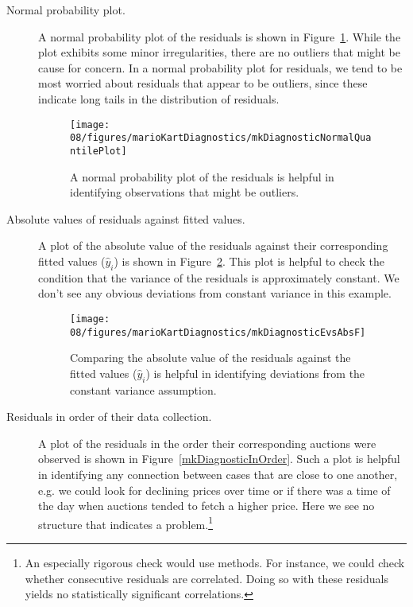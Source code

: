 \begin{description}
\item[Normal probability plot.] A normal probability plot of the residuals is shown in Figure~\ref{mkDiagnosticNormalQuantilePlot}. While the plot exhibits some minor irregularities, there are no outliers that might be cause for concern. In a normal probability plot for residuals, we tend to be most worried about residuals that appear to be outliers, since these indicate long tails in the distribution of residuals.

\begin{figure}
\centering
\texttt{[image: 08/figures/marioKartDiagnostics/mkDiagnosticNormalQuantilePlot]}
\caption{A normal probability plot of the residuals is helpful in identifying observations that might be outliers.}
\label{mkDiagnosticNormalQuantilePlot}
\end{figure}

\item[Absolute values of residuals against fitted values.] A plot of the absolute value of the residuals against their corresponding fitted values ($\hat{y}_i$) is shown in Figure~\ref{mkDiagnosticEvsAbsF}. This plot is helpful to check the condition that the variance of the residuals is approximately constant. We don't see any obvious deviations from constant variance in this example.

\begin{figure}
\centering
\texttt{[image: 08/figures/marioKartDiagnostics/mkDiagnosticEvsAbsF]}
\caption{Comparing the absolute value of the residuals against the fitted values ($\hat{y}_i$) is helpful in identifying deviations from the constant variance assumption.}
\label{mkDiagnosticEvsAbsF}
\end{figure}

\item[Residuals in order of their data collection.] A plot of the residuals in the order their corresponding auctions were observed is shown in Figure~\ref{mkDiagnosticInOrder}. Such a plot is helpful in identifying any connection between cases that are close to one another, e.g. we could look for declining prices over time or if there was a time of the day when auctions tended to fetch a higher price. Here we see no structure that indicates a problem.\footnote{An especially rigorous check would use  methods. For instance, we could check whether consecutive residuals are correlated. Doing so with these residuals yields no statistically significant correlations.}


\end{description}
